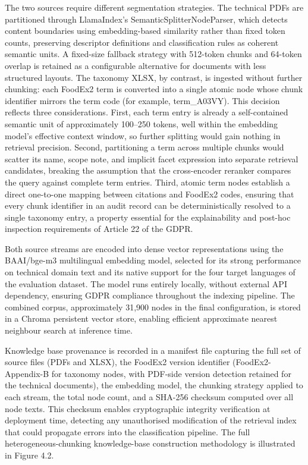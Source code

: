 The two sources require different segmentation strategies. The technical PDFs are partitioned through LlamaIndex's SemanticSplitterNodeParser, which detects content boundaries using embedding-based similarity rather than fixed token counts, preserving descriptor definitions and classification rules as coherent semantic units. A fixed-size fallback strategy with 512-token chunks and 64-token overlap is retained as a configurable alternative for documents with less structured layouts. The taxonomy XLSX, by contrast, is ingested without further chunking: each FoodEx2 term is converted into a single atomic node whose chunk identifier mirrors the term code (for example, term\_A03VY). This decision reflects three considerations. First, each term entry is already a self-contained semantic unit of approximately 100--250 tokens, well within the embedding model's effective context window, so further splitting would gain nothing in retrieval precision. Second, partitioning a term across multiple chunks would scatter its name, scope note, and implicit facet expression into separate retrieval candidates, breaking the assumption that the cross-encoder reranker compares the query against complete term entries. Third, atomic term nodes establish a direct one-to-one mapping between citations and FoodEx2 codes, ensuring that every chunk identifier in an audit record can be deterministically resolved to a single taxonomy entry, a property essential for the explainability and post-hoc inspection requirements of Article 22 of the GDPR.

Both source streams are encoded into dense vector representations using the BAAI/bge-m3 multilingual embedding model, selected for its strong performance on technical domain text and its native support for the four target languages of the evaluation dataset. The model runs entirely locally, without external API dependency, ensuring GDPR compliance throughout the indexing pipeline. The combined corpus, approximately 31,900 nodes in the final configuration, is stored in a Chroma persistent vector store, enabling efficient approximate nearest neighbour search at inference time.

Knowledge base provenance is recorded in a manifest file capturing the full set of source files (PDFs and XLSX), the FoodEx2 version identifier (FoodEx2-Appendix-B for taxonomy nodes, with PDF-side version detection retained for the technical documents), the embedding model, the chunking strategy applied to each stream, the total node count, and a SHA-256 checksum computed over all node texts. This checksum enables cryptographic integrity verification at deployment time, detecting any unauthorised modification of the retrieval index that could propagate errors into the classification pipeline. The full heterogeneous-chunking knowledge-base construction methodology is illustrated in Figure 4.2.

